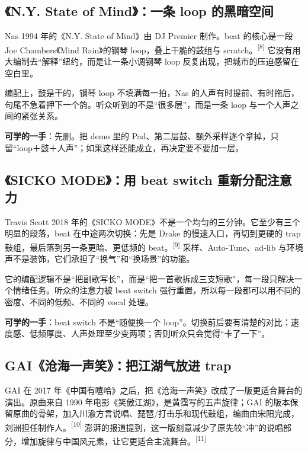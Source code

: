 \subsection{《N.Y. State of Mind》：一条 loop 的黑暗空间}
\label{sec:hiphop-case-ny-state}

Nas 1994 年的《N.Y. State of Mind》由 DJ Premier 制作。beat 的核心是一段 Joe Chambers《Mind Rain》的钢琴 loop，叠上干脆的鼓组与 scratch。{\textsuperscript{[8]}} 它没有用大编制去“解释”纽约，而是让一条小调钢琴 loop 反复出现，把城市的压迫感留在空白里。

编配上，鼓是干的，钢琴 loop 不填满每一拍，Nas 的人声有时提前、有时拖后，句尾不急着押下一个韵。听众听到的不是“很多层”，而是一条 loop 与一个人声之间的紧张关系。

\textbf{可学的一手}：先删。把 demo 里的 Pad、第二层鼓、额外采样逐个拿掉，只留“loop＋鼓＋人声”；如果这样还能成立，再决定要不要加一层。

\subsection{《SICKO MODE》：用 beat switch 重新分配注意力}
\label{sec:hiphop-case-sicko}

Travis Scott 2018 年的《SICKO MODE》不是一个均匀的三分钟。它至少有三个明显的段落，beat 在中途两次切换：先是 Drake 的慢速入口，再切到更硬的 trap 鼓组，最后落到另一条更暗、更低频的 beat。{\textsuperscript{[9]}} 采样、Auto-Tune、ad-lib 与环境声不是装饰，它们承担了“换气”和“换场景”的功能。

它的编配逻辑不是“把副歌写长”，而是“把一首歌拆成三支短歌”，每一段只解决一个情绪任务。听众的注意力被 beat switch 强行重置，所以每一段都可以用不同的密度、不同的低频、不同的 vocal 处理。

\textbf{可学的一手}：beat switch 不是“随便换一个 loop”。切换前后要有清楚的对比：速度感、低频厚度、人声处理至少变两项；否则听众只会觉得“卡了一下”。

\subsection{GAI《沧海一声笑》：把江湖气放进 trap}
\label{sec:hiphop-case-gai}

GAI 在 2017 年《中国有嘻哈》之后，把《沧海一声笑》改成了一版更适合舞台的演出。原曲来自 1990 年电影《笑傲江湖》，是黄霑写的五声旋律；GAI 的版本保留原曲的骨架，加入川渝方言说唱、琵琶/打击乐和现代鼓组，编曲由宋阳完成，刘洲担任制作人。{\textsuperscript{[10]}} 澎湃的报道提到，这一版刻意减少了原先较“冲”的说唱部分，增加旋律与中国风元素，让它更适合主流舞台。{\textsuperscript{[11]}}

